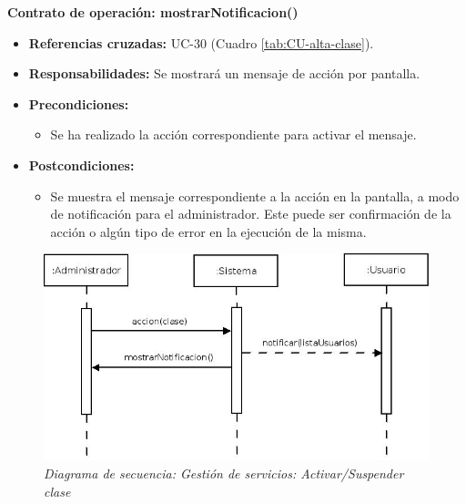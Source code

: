 \textbf{Contrato de operación: mostrarNotificacion()}
\begin{itemize}
\item \textbf{Referencias cruzadas:} UC-30 (Cuadro \ref{tab:CU-alta-clase}).
\item \textbf{Responsabilidades:} Se mostrará un mensaje de acción por pantalla.
\item \textbf{Precondiciones:} 
 \begin{itemize}
\item Se ha realizado la acción correspondiente para activar el mensaje.
\end {itemize}
\item \textbf{Postcondiciones:} 
 \begin{itemize}
\item Se muestra el mensaje correspondiente a la acción en la pantalla, a modo de notificación para el administrador. Este puede ser confirmación de la acción o algún tipo de error en la ejecución de la misma.
\end {itemize}
\end {itemize}


\vspace{10mm}

\begin{figure}[H]
\centering
  \includegraphics[scale=.55]{img/secuencias/gestion-servicios-suspender-activar-clase.jpeg}
  \caption{\textit{Diagrama de secuencia: Gestión de servicios: Activar/Suspender clase}}
  \label{fig:secuencia-gestion-servicios-suspender-activar-clase}
\end{figure}

